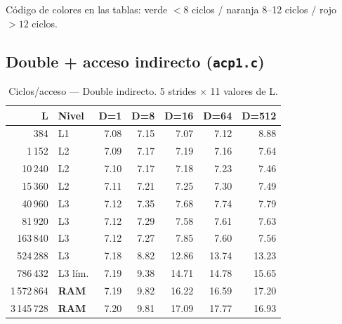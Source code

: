 \documentclass[12pt,a4paper]{article}
\newcommand{\cverde}[1]{\textcolor{verde}{#1}}
\newcommand{\cnaranja}[1]{\textcolor{naranja}{#1}}
\newcommand{\crojo}[1]{\textcolor{rojo}{#1}}
\begin{document}
Código de colores en las tablas: \cverde{verde $< 8$ ciclos} / \cnaranja{naranja 8--12 ciclos} / \crojo{rojo $> 12$ ciclos}.

\subsection{Double + acceso indirecto (\texttt{acp1.c})}

\begin{table}[H]
\centering
\caption{Ciclos/acceso --- Double indirecto. 5 strides $\times$ 11 valores de L.}
\label{tab:double_ind}
\setlength{\tabcolsep}{5pt}\footnotesize
\begin{tabular}{rlrrrrr}
\toprule
\textbf{L} & \textbf{Nivel} & \textbf{D=1} & \textbf{D=8} & \textbf{D=16} & \textbf{D=64} & \textbf{D=512} \\
\midrule
384         & L1           & \cverde{7.08}  & \cverde{7.15}  & \cverde{7.07}  & \cverde{7.12}  & \cnaranja{8.88} \\
1\,152      & L2           & \cverde{7.09}  & \cverde{7.17}  & \cverde{7.19}  & \cverde{7.16}  & \cverde{7.64} \\
10\,240     & L2           & \cverde{7.10}  & \cverde{7.17}  & \cverde{7.18}  & \cverde{7.23}  & \cverde{7.46} \\
15\,360     & L2           & \cverde{7.11}  & \cverde{7.21}  & \cverde{7.25}  & \cverde{7.30}  & \cverde{7.49} \\
40\,960     & L3           & \cverde{7.12}  & \cverde{7.35}  & \cverde{7.68}  & \cverde{7.74}  & \cverde{7.79} \\
81\,920     & L3           & \cverde{7.12}  & \cverde{7.29}  & \cverde{7.58}  & \cverde{7.61}  & \cverde{7.63} \\
163\,840    & L3           & \cverde{7.12}  & \cverde{7.27}  & \cverde{7.85}  & \cverde{7.60}  & \cverde{7.56} \\
524\,288    & L3           & \cverde{7.18}  & \cnaranja{8.82} & \crojo{12.86} & \crojo{13.74}  & \crojo{13.23} \\
786\,432    & L3 lím.      & \cverde{7.19}  & \cnaranja{9.38} & \crojo{14.71} & \crojo{14.78}  & \crojo{15.65} \\
1\,572\,864 & \textbf{RAM} & \cverde{7.19}  & \cnaranja{9.82} & \crojo{16.22} & \crojo{16.59}  & \crojo{17.20} \\
3\,145\,728 & \textbf{RAM} & \cverde{7.20}  & \cnaranja{9.81} & \crojo{17.09} & \crojo{17.77}  & \crojo{16.93} \\
\bottomrule
\end{tabular}
\end{table}
\end{document}
